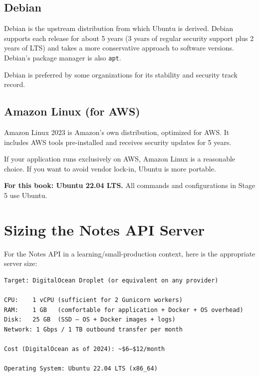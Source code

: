 \subsection*{Debian}\label{20-server-fundamentals:debian}

Debian is the upstream distribution from which Ubuntu is derived. Debian supports each release for about 5 years (3 years of regular security support plus 2 years of LTS) and takes a more conservative approach to software versions. Debian's package manager is also \texttt{apt}.

Debian is preferred by some organizations for its stability and security track record.

\subsection*{Amazon Linux (for AWS)}\label{20-server-fundamentals:amazon-linux-for-aws}

Amazon Linux 2023 is Amazon's own distribution, optimized for AWS. It includes AWS tools pre-installed and receives security updates for 5 years.

If your application runs exclusively on AWS, Amazon Linux is a reasonable choice. If you want to avoid vendor lock-in, Ubuntu is more portable.

\textbf{For this book: Ubuntu 22.04 LTS.} All commands and configurations in Stage 5 use Ubuntu.

\setcounter{section}{5}
\section{Sizing the Notes API Server}\label{20-server-fundamentals:206-sizing-the-notes-api-server}

For the Notes API in a learning/small-production context, here is the appropriate server size:

\begin{outputbox}[short]
\begin{Verbatim}[fontsize=\codesize, breaklines, breakanywhere, breaksymbolleft={\tiny\textcolor{muted}{$\hookrightarrow$}}]
Target: DigitalOcean Droplet (or equivalent on any provider)

CPU:    1 vCPU (sufficient for 2 Gunicorn workers)
RAM:    1 GB   (comfortable for application + Docker + OS overhead)
Disk:   25 GB  (SSD — OS + Docker images + logs)
Network: 1 Gbps / 1 TB outbound transfer per month

Cost (DigitalOcean as of 2024): ~$6–$12/month

Operating System: Ubuntu 22.04 LTS (x86_64)
\end{Verbatim}
\end{outputbox}

